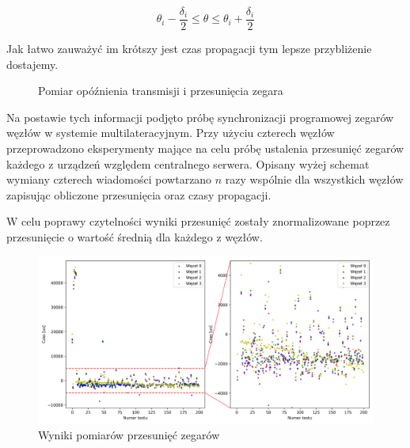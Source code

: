 \[\theta_i - \frac{\delta_i}{2} \leqslant \theta \leqslant \theta_i + \frac{\delta_i}{2}\]

Jak łatwo zauważyć im krótszy jest czas propagacji tym lepsze przybliżenie dostajemy.

\begin{figure}[H]
    \centering
    \caption{Pomiar opóźnienia transmisji i przesunięcia zegara}
    \label{fig:ntp}
\end{figure}

Na postawie tych informacji podjęto próbę synchronizacji programowej zegarów węzłów w systemie multilateracyjnym. Przy użyciu czterech węzłów przeprowadzono eksperymenty mające na celu próbę ustalenia przesunięć zegarów każdego z urządzeń względem centralnego serwera. Opisany wyżej schemat wymiany czterech wiadomości powtarzano $n$ razy wspólnie dla wszystkich węzłów zapisując obliczone przesunięcia oraz czasy propagacji.

W celu poprawy czytelności wyniki przesunięć zostały znormalizowane poprzez przesunięcie o wartość średnią dla każdego z węzłów.

\begin{figure}[H]
    \centering
    \includegraphics[width=\textwidth]{pics/ntp_sync/offsets.png}
    \caption{Wyniki pomiarów przesunięć zegarów}
    \label{pic:offsets_ntp}
\end{figure}

